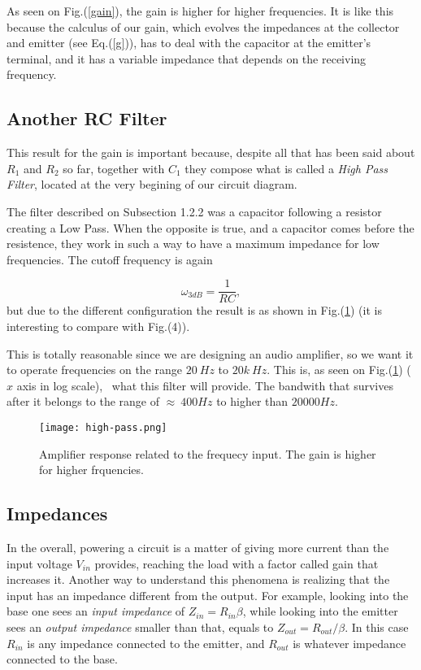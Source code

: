 \documentclass{article}
\begin{document}
{As seen on Fig.(\ref{gain}), the gain is higher for higher
frequencies. It is like this because the calculus of our gain, which
evolves the impedances at the collector and emitter (see Eq.(\ref{g})), has to deal with the
capacitor at the emitter's terminal, and it has a variable impedance that
depends on the receiving frequency. 

\subsection{Another RC Filter}

This result for the gain is important because, despite all that has been
said about $R_{1}$ and $R_{2}$ so far, together with
$C_{1}$ they compose what is called a \emph{High Pass Filter}, located
at the very begining of our circuit diagram.

The filter described on Subsection 1.2.2 was a
capacitor following a resistor creating a Low Pass. When the opposite is
true, and a capacitor comes before the resistence, they work in such a
way to have a maximum impedance for low frequencies. The cutoff
frequency is again 

\begin{equation}
\omega_{3dB}=\frac{1}{RC}, 
\label{3dB2}
\end{equation}
but due to the different configuration the result is as shown in
Fig.(\ref{high}) (it is interesting to compare with Fig.(4)).

This is totally reasonable since we are designing an audio amplifier, so
we want it to operate frequencies on the range $20 \ Hz$ to $20k \
Hz$. This is, as seen on Fig.(\ref{high}) ($x$ axis in log scale), \
what this filter will provide. The bandwith that survives after it
belongs to the range of $\approx \ 400Hz$ to higher than $20000 Hz$.

\begin{figure}[H]
\center
\texttt{[image: high-pass.png]}
\caption {Amplifier response related to the frequecy input. The gain is
  higher for higher frquencies.} 
\label{high}
\end{figure}

\subsection{Impedances}

In the overall, powering a circuit is a matter of giving more current than the input
voltage $V_{in}$ provides, reaching the load with a
factor called gain that increases it. Another way to understand this
phenomena is realizing that the input has an impedance different from the
output. For example, looking into the base one sees an \emph{input impedance} of
$Z_{in}=R_{in} \beta$, while looking into the emitter sees an \emph{output impedance}
smaller than that, equals to $Z_{out}=R_{out}/\beta$. In this case
$R_{in}$ is any impedance connected to the emitter, and $R_{out}$ is
whatever impedance connected to the base. 

}
\end{document}
